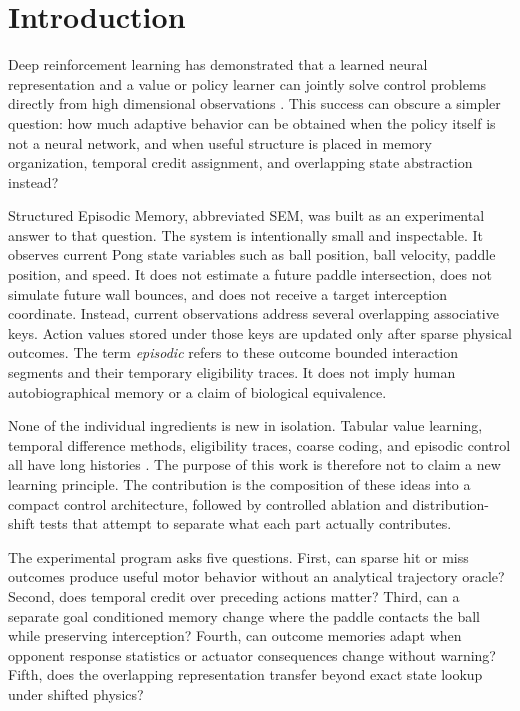 \documentclass[10pt,twocolumn]{article}
\begin{document}
\section{Introduction}
Deep reinforcement learning has demonstrated that a learned neural representation and a value or policy learner can jointly solve control problems directly from high dimensional observations \citep{mnih2015dqn}. This success can obscure a simpler question: how much adaptive behavior can be obtained when the policy itself is not a neural network, and when useful structure is placed in memory organization, temporal credit assignment, and overlapping state abstraction instead?

Structured Episodic Memory, abbreviated SEM, was built as an experimental answer to that question. The system is intentionally small and inspectable. It observes current Pong state variables such as ball position, ball velocity, paddle position, and speed. It does not estimate a future paddle intersection, does not simulate future wall bounces, and does not receive a target interception coordinate. Instead, current observations address several overlapping associative keys. Action values stored under those keys are updated only after sparse physical outcomes. The term \emph{episodic} refers to these outcome bounded interaction segments and their temporary eligibility traces. It does not imply human autobiographical memory or a claim of biological equivalence.

None of the individual ingredients is new in isolation. Tabular value learning, temporal difference methods, eligibility traces, coarse coding, and episodic control all have long histories \citep{sutton1988td,watkins1992q,sutton2018rl,sutton1996coarse,albus1975cmac,blundell2016mfec,pritzel2017nec}. The purpose of this work is therefore not to claim a new learning principle. The contribution is the composition of these ideas into a compact control architecture, followed by controlled ablation and distribution-shift tests that attempt to separate what each part actually contributes.

The experimental program asks five questions. First, can sparse hit or miss outcomes produce useful motor behavior without an analytical trajectory oracle? Second, does temporal credit over preceding actions matter? Third, can a separate goal conditioned memory change where the paddle contacts the ball while preserving interception? Fourth, can outcome memories adapt when opponent response statistics or actuator consequences change without warning? Fifth, does the overlapping representation transfer beyond exact state lookup under shifted physics?
\end{document}
